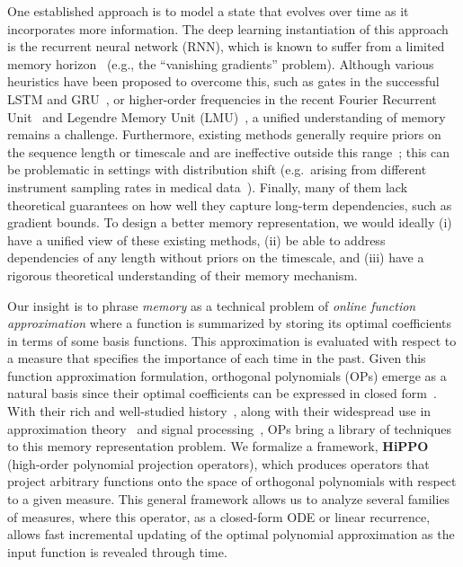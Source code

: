 \documentclass{article}
\begin{document}
  One established approach is to model
  a state that evolves over time as it incorporates more information.
  The deep learning instantiation of this approach is the recurrent neural network (RNN),
  which is known to suffer from a limited memory horizon~\citep{lstm,jaeger2004harnessing,pascanu2013difficulty} (e.g., the ``vanishing gradients'' problem).
  Although various heuristics have been proposed to overcome this,
  such as gates in the successful LSTM and GRU~\citep{lstm, cho2014learning},
  or higher-order frequencies in the recent Fourier Recurrent
  Unit~\citep{zhang2018learning} and Legendre Memory Unit
  (LMU)~\citep{voelker2019legendre},
  a unified understanding of memory remains a challenge.
  Furthermore, existing methods generally require priors on the sequence length or timescale and are ineffective outside this range~\citep{tallec2018can, voelker2019legendre}; this can be problematic in settings with distribution shift (e.g.\ arising from different instrument sampling rates in medical data~\cite{saab2020weak,shah2018temple}).
  Finally, many of them lack theoretical guarantees on how well they capture long-term
  dependencies, such as gradient bounds.
  To design a better memory representation, we would ideally
  (i) have a unified view of these existing methods,
  (ii) be able to address dependencies of any length without priors on the timescale,
  and
  (iii) have a rigorous theoretical understanding of their memory mechanism.







  Our insight is to phrase \emph{memory} as a technical problem of \emph{online
    function approximation} where a function  is summarized by storing its
  optimal coefficients in terms of some basis functions.
  This approximation is evaluated with respect to a measure that
  specifies the importance of each time in the past.
  Given this function approximation formulation, orthogonal polynomials (OPs) emerge as a natural basis since
  their optimal coefficients can be expressed in closed form~\citep{chihara}.
  With their rich and well-studied history~\citep{szego}, along with their
  widespread use in approximation theory~\citep{trefethen2019approximation} and
  signal processing~\citep{proakis2001digital}, OPs bring a library of
  techniques to this memory representation problem.
  We formalize a framework, \textbf{HiPPO} (high-order polynomial projection
  operators), which produces operators that project arbitrary functions onto the space of
  orthogonal polynomials with respect to a given measure.
  This general framework allows us to analyze several families of measures,
  where this operator, as a closed-form ODE or linear recurrence, allows fast incremental updating of the optimal polynomial approximation as the input function is revealed through time.
\end{document}
